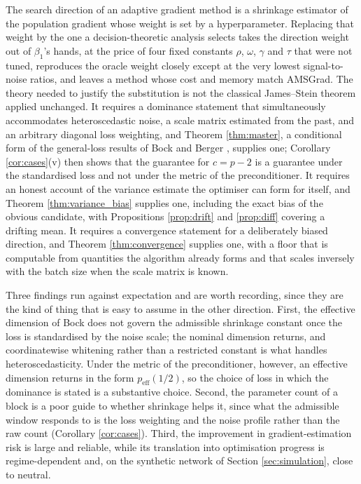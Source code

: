 \documentclass[pdflatex,sn-mathphys-num]{sn-jnl}%
\theoremstyle{thmstyleone}%
\theoremstyle{thmstyletwo}%
\theoremstyle{thmstylethree}%
\newcommand{\rev}[1]{{\color{blue}#1}}
\newcommand{\peffq}[1]{p_{\mathrm{eff}}(#1)}
\begin{document}
The search direction of an adaptive gradient method is a shrinkage estimator of the population gradient whose weight is set by a hyperparameter. Replacing that weight by the one a decision-theoretic analysis selects \rev{takes the direction weight out of $\beta_1$'s hands, at the price of four fixed constants $\rho$, $\omega$, $\gamma$ and $\tau$ that were not tuned}, reproduces the oracle weight closely except at the very lowest signal-to-noise ratios, and leaves a method whose cost and memory match AMSGrad. The theory needed to justify the substitution is not the classical James--Stein theorem applied unchanged. It requires a dominance statement that simultaneously accommodates heteroscedastic noise, a scale matrix estimated from the past, and \rev{an arbitrary diagonal loss weighting, and Theorem \ref{thm:master}, a conditional form of the general-loss results of Bock \cite{bock1975} and Berger \cite{berger1976jmva}, supplies one; Corollary \ref{cor:cases}(v) then shows that the guarantee for $c=p-2$ is a guarantee under the standardised loss and not under the metric of the preconditioner.} It requires an honest account of the variance estimate the optimiser can form for itself, and Theorem \ref{thm:variance_bias} supplies one, including the exact bias of the obvious candidate\rev{, with Propositions \ref{prop:drift} and \ref{prop:diff} covering a drifting mean}. It requires a convergence statement for a deliberately biased direction, and Theorem \ref{thm:convergence} supplies one, with a floor that is computable from quantities the algorithm already forms and that scales inversely with the batch size\rev{ when the scale matrix is known}.

Three findings run against expectation and are worth recording, since they are the kind of thing that is easy to assume in the other direction. First, the effective dimension of Bock \cite{bock1975} does not govern the admissible shrinkage constant once the loss is standardised by the noise scale; the nominal dimension returns, and coordinatewise whitening rather than a restricted constant is what handles heteroscedasticity\rev{. Under the metric of the preconditioner, however, an effective dimension returns in the form $\peffq{1/2}$, so the choice of loss in which the dominance is stated is a substantive choice}. Second, the parameter count of a block is a poor guide to whether shrinkage helps it, since what the admissible window responds to is the loss weighting and the noise profile rather than the raw count (Corollary \ref{cor:cases}). Third, the improvement in gradient-estimation risk is large and reliable, while its translation into optimisation progress is regime-dependent and, on the synthetic network of Section \ref{sec:simulation}, close to neutral.
\end{document}

